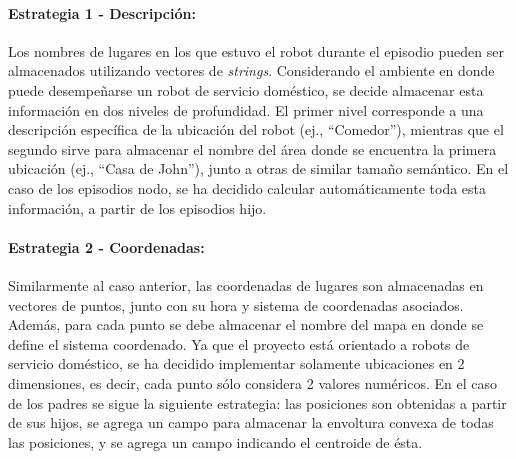 \paragraph{Estrategia 1 - Descripción:}
Los nombres de lugares en los que estuvo el robot durante el episodio pueden ser almacenados utilizando vectores de \textit{strings}. Considerando el ambiente en donde puede desempeñarse un robot de servicio doméstico, se decide almacenar esta información en dos niveles de profundidad. El primer nivel corresponde a una descripción específica de la ubicación del robot (ej., ``Comedor''), mientras que el segundo sirve para almacenar el nombre del área donde se encuentra la primera ubicación (ej., ``Casa de John''), junto a otras de similar tamaño semántico. En el caso de los episodios nodo, se ha decidido calcular automáticamente toda esta información, a partir de los episodios hijo.

\paragraph{Estrategia 2 - Coordenadas:}
Similarmente al caso anterior, las coordenadas de lugares son almacenadas en vectores de puntos, junto con su hora y sistema de coordenadas asociados. Además, para cada punto se debe almacenar el nombre del mapa en donde se define el sistema coordenado. Ya que el proyecto está orientado a robots de servicio doméstico, se ha decidido implementar solamente ubicaciones en 2 dimensiones, es decir, cada punto sólo considera 2 valores numéricos. En el caso de los padres se sigue la siguiente estrategia: las posiciones son obtenidas a partir de sus hijos, se agrega un campo para almacenar la envoltura convexa de todas las posiciones, y se agrega un campo indicando el centroide de ésta.

